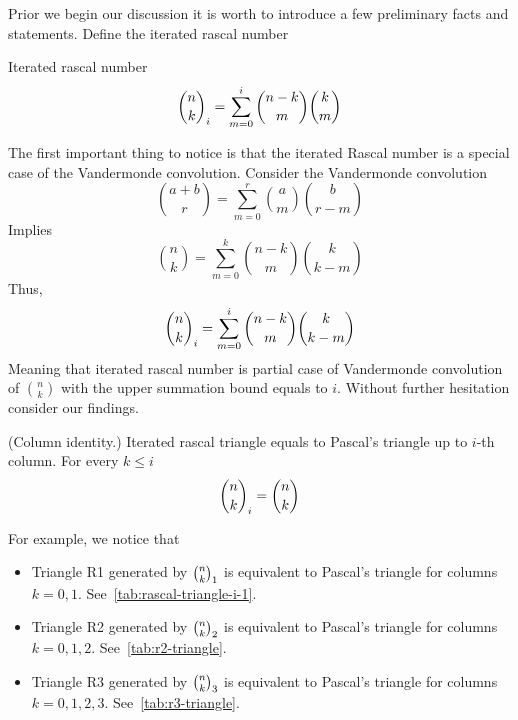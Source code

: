 ﻿Prior we begin our discussion it is worth to introduce a few preliminary facts and statements.
Define the iterated rascal number~\cite[eq. 3.2]{gregory2022iterated_thesis}
\begin{definition}
    Iterated rascal number
    \begin{align}
        \binom{n}{k}_{i} = \sum_{m=0}^{i} \binom{n-k}{m} \binom{k}{m}
    \end{align}
\end{definition}
The first important thing to notice is that the iterated Rascal number is a special case of the Vandermonde convolution.
Consider the Vandermonde convolution~\cite{andrews1999special}
\begin{equation*}
    \binom{a+b}{r} = \sum_{m=0}^{r} \binom{a}{m} \binom{b}{r-m}
\end{equation*}
Implies
\begin{equation*}
    \binom{n}{k} = \sum_{m=0}^{k} \binom{n-k}{m} \binom{k}{k-m}
\end{equation*}
Thus,
\begin{equation}
    \binom{n}{k}_{i} = \sum_{m=0}^{i} \binom{n-k}{m} \binom{k}{k-m}
    \label{eq:rascal-vandermonde-convolution}
\end{equation}
Meaning that iterated rascal number is partial case of Vandermonde convolution of $\binom{n}{k}$
with the upper summation bound equals to $i$.
Without further hesitation consider our findings.
\begin{proposition}
    \label{prop:rascal-binomial-identity-for-i}
    (Column identity.)
    Iterated rascal triangle equals to Pascal's triangle up to $i$-th column.
    For every $k\leq i$
    \begin{equation}
        \binom{n}{k}_{i} = \binom{n}{k}
        \label{eq:rascal-column-identity}
    \end{equation}
\end{proposition}
For example, we notice that
\begin{itemize}
    \item Triangle R1 generated by $\binom{n}{k}_{1}$ is equivalent to Pascal's triangle for columns $k=0,1$.
    See~\eqref{tab:rascal-triangle-i-1}.
    \item Triangle R2 generated by $\binom{n}{k}_{2}$ is equivalent to Pascal's triangle for columns $k=0,1,2$.
    See~\eqref{tab:r2-triangle}.
    \item Triangle R3 generated by $\binom{n}{k}_{3}$ is equivalent to Pascal's triangle for columns $k=0,1,2,3$.
    See~\eqref{tab:r3-triangle}.
\end{itemize}
